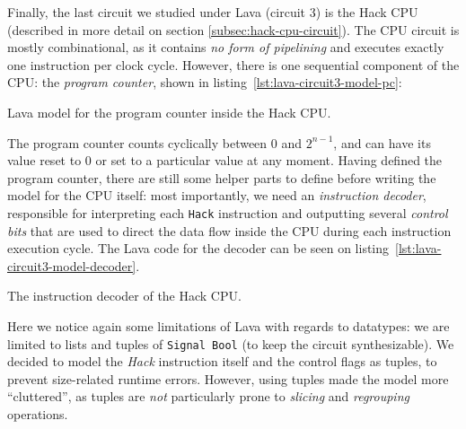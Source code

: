             Finally, the last circuit we studied under Lava (circuit 3) is the Hack CPU (described
            in more detail on section \ref{subsec:hack-cpu-circuit}). The CPU circuit is mostly
            combinational, as it contains \emph{no form of pipelining} and executes exactly one
            instruction per clock cycle. However, there is one sequential component of the CPU: the
            \emph{program counter}, shown in listing~\ref{lst:lava-circuit3-model-pc}:

            \begin{listing}[h!]
                \caption{Lava model for the program counter inside the Hack CPU.
                    \label{lst:lava-circuit3-model-pc}}
            \end{listing}

            The program counter counts cyclically between $ 0 $ and $ 2^{n-1} $, and can have its
            value reset to 0 or set to a particular value at any moment. Having defined the program
            counter, there are still some helper parts to define before writing the model for the
            CPU itself: most importantly, we need an \emph{instruction decoder}, responsible for
            interpreting each \texttt{Hack} instruction and outputting several \emph{control bits}
            that are used to direct the data flow inside the CPU during each instruction execution
            cycle. The Lava code for the decoder can be seen on
            listing~\ref{lst:lava-circuit3-model-decoder}.

            \begin{listing}[h!]
                \caption{The instruction decoder of the Hack CPU.
                    \label{lst:lava-circuit3-model-decoder}}
            \end{listing}

            Here we notice again some limitations of Lava with regards to datatypes: we are limited
            to lists and tuples of \texttt{Signal Bool} (to keep the circuit synthesizable). We
            decided to model the \emph{Hack} instruction itself and the control flags as tuples, to
            prevent size-related runtime errors. However, using tuples made the model more
            ``cluttered'', as tuples are \emph{not} particularly prone to \emph{slicing} and
            \emph{regrouping} operations.

